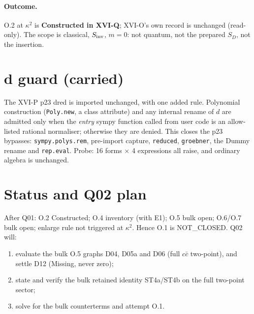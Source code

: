\paragraph{Outcome.} O.2 at $\kappa^2$ is \textbf{Constructed in XVI-Q}; XVI-O's own record is unchanged (read-only).
The scope is classical, $S_{\rm inv}$, $m=0$: not quantum, not the prepared $S_D$, not the insertion.

\section{d guard (carried)}
The XVI-P p23 dred is imported unchanged, with one added rule. Polynomial construction (\texttt{Poly.new}, a class
attribute) and any internal rename of $d$ are admitted only when the \emph{entry} sympy function called from user
code is an allow-listed rational normaliser; otherwise they are denied. This closes the p23 bypasses:
\texttt{sympy.polys.rem}, pre-import capture, \texttt{reduced}, \texttt{groebner}, the Dummy rename and
\texttt{rep.eval}. Probe: 16 forms $\times$ 4 expressions all raise, and ordinary algebra is unchanged.

\section{Status and Q02 plan}
After Q01: O.2 Constructed; O.4 inventory (with E1); O.5 bulk open; O.6/O.7 bulk open; enlarge rule not triggered at
$\kappa^2$. Hence O.1 is NOT\_CLOSED. Q02 will:
\begin{enumerate}
\item evaluate the bulk O.5 graphs D04, D05a and D06 (full $c\bar c$ two-point), and settle D12 (Missing, never
zero);
\item state and verify the bulk retained identity ST4a/ST4b on the full two-point sector;
\item solve for the bulk counterterms and attempt O.1.
\end{enumerate}

